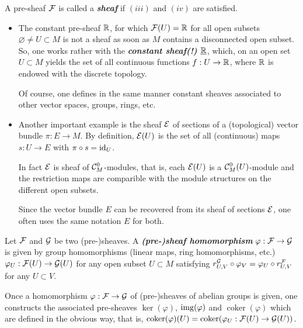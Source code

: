 \begin{defn}
	A pre-sheaf $\mathcal{F}$ is called a \textbf{\textit{sheaf}} if $(iii)$ and $(iv)$ are satisfied.
\end{defn}
\begin{example}\leavevmode
	\begin{itemize}
		\item The constant pre-sheaf $\mathbb{R}$, for which $\mathcal{F}(U)=\mathbb{R}$ for all open subsets $\varnothing\neq U\subset M$ is not a sheaf as soon as $M$ contains a disconnected open subset. So, one works rather with the \textbf{\textit{constant sheaf(!) $\underline{\mathbb{R}}$}}, which, on an open set $U\subset M$ yields the set of all continuous functions $f:U\to\mathbb{R}$, where $\mathbb{R}$ is endowed with the discrete topology.
	
		Of course, one defines in the same manner constant sheaves associated to other vector spaces, groups, rings, etc.
		\item Another important example is the sheaf $\mathcal{E}$ of sections of a (topological) vector bundle $\pi:E\to M$. By definition, $\mathcal{E}(U)$ is the set of all (continuous) maps $s:U\to E$ with $\pi\circ s=\operatorname{id}_U$.
		
		In fact $\mathcal{E}$ is sheaf of $\mathcal{C}_M^0$-modules, that is, each $\mathcal{E}(U)$ is a $\mathcal{C}_M^0(U)$-module and the restriction maps are comparible with the module structures on the different open subsets.
		
		Since the vector bundle $E$ can be recovered from its sheaf of sections $\mathcal{E}$, one often uses the same notation $E$ for both.
	\end{itemize}
\end{example}

\begin{defn}
	Let $\mathcal{F}$ and $\mathcal{G}$ be two (pre-)sheaves. A \textbf{\textit{(pre-)sheaf homomorphism}} $\varphi:\mathcal{F}\to\mathcal{G}$ is given by group homomorphisms (linear maps, ring homomorphisms, etc.) $\varphi_U:\mathcal{F}(U)\to\mathcal{G}(U)$ for any open subset $U\subset M$ satisfying $r_{U,V}^{\mathcal{G}}\circ \varphi_V=\varphi_U\circ r_{U,V}^{\mathcal{F}}$ for any $U\subset V$.
\end{defn}
Once a homomorphism $\varphi:\mathcal{F}\to \mathcal{G}$ of (pre-)sheaves of abelian groups is given, one constructs the associated pre-sheaves $\ker(\varphi)$, $\operatorname{img}(\varphi)$ and $\operatorname{coker}(\varphi)$ which are defined in the obvious way, that is, $\operatorname{coker}(\varphi)(U)=\operatorname{coker}(\varphi_U:\mathcal{F}(U)\to\mathcal{G}(U))$.


